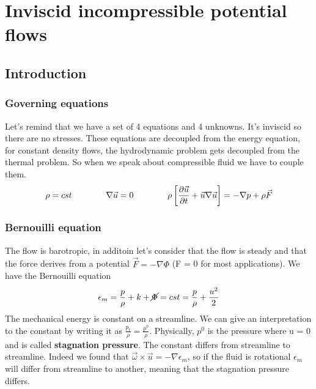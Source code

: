 
\chapter{Inviscid incompressible potential flows}

\section{Introduction}
	\subsection{Governing equations}
		Let's remind that we have a set of 4 equations and 4 unknowns. It's inviscid so there are no stresses. These equations are decoupled from the energy equation, for constant density flows, the hydrodynamic problem gets decoupled from the thermal problem. So when we speak about compressible fluid we have to couple them. 
		\begin{equation}
			\rho = cst \qquad\qquad \nabla \vec{u} = 0 \qquad\qquad \rho \left[\frac{\partial \vec{u}}{\partial t} + \vec{u} \nabla \vec{u} \right] = -\nabla p +\rho \vec{F}
			\label{eq:3.1}
		\end{equation}
		
	\subsection{Bernouilli equation}
		The flow is barotropic, in additoin let's consider that the flow is steady and that the force derives from a potential $\vec{F} = -\nabla \Phi$ (F = 0 for most applications). We have the Bernouilli equation
		\begin{equation}
			\epsilon _m = \frac{p}{\rho}+k + \cancel{\Phi} = cst = \frac{p}{\rho} +\frac{u^2}{2}
		\end{equation}
		The mechanical energy is constant on a streamline. We can give an interpretation to the constant by writing it as $\frac{p_t}{\rho} = \frac{p^0}{\rho}$. Physically, $p^0$ is the pressure where u = 0 and is called \textbf{stagnation pressure}. The constant differs from streamline to streamline. Indeed we found that $\vec{\omega}\times \vec{u} = -\nabla \epsilon _m$, so if the fluid is rotational $\epsilon _m$ will differ from streamline to another, meaning that the stagnation pressure differs. 
		

